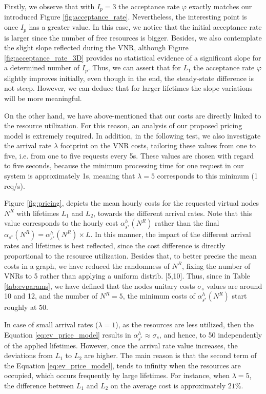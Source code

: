Firstly, we observe that with $I_p = 3$ the acceptance rate $\varphi$ exactly matches our introduced Figure \ref{fig:acceptance_rate}. Nevertheless, the interesting point is once $I_p$ has a greater value. In this case, we notice that the initial acceptance rate is larger since the number of free resources is bigger. Besides, we also contemplate the slight slope reflected during the VNR, although Figure \ref{fig:acceptance_rate_3D} provides no statistical evidence of a significant slope for a determined number of $I_p$. Thus, we can assert that for $L_1$ the acceptance rate $\varphi$ slightly improves initially, even though in the end, the steady-state difference is not steep. However, we can deduce that for larger lifetimes the slope variations will be more meaningful.

On the other hand, we have above-mentioned that our costs are directly linked to the resource utilization. For this reason, an analysis of our proposed pricing model is extremely required. In addition, in the following test, we also investigate the arrival rate $\lambda$ footprint on the VNR costs, tailoring these values from one to five, i.e. from one to five requests every 5s. These values are chosen with regard to five seconds, because the minimum processing time for one request in our system is approximately 1s, meaning that $\lambda = 5$ corresponds to this minimum (1 req/s).

Figure \ref{fig:pricing}, depicts the mean hourly costs for the requested virtual nodes $N^R$ with lifetimes $L_1$ and $L_2$, towards the different arrival rates. Note that this value corresponds to the hourly cost $\alpha^{h}_{s^{*}}(N^R)$ rather than the final $ \alpha_{s^{*}}(N^R) = \alpha^{h}_{s^{*}}(N^R) \times L$. In this manner, the impact of the different arrival rates and lifetimes is best reflected, since the cost difference is directly proportional to the resource utilization. Besides that, to better precise the mean costs in a graph, we have reduced the randomness of $N^R$, fixing the number of VNRs to 5 rather than applying a uniform distrib. [5,10]. Thus, since in Table \ref{tab:evparams}, we have defined that the nodes unitary costs $\sigma_s$ values are around 10 and 12, and the number of $N^R = 5$, the minimum costs of $\alpha^{h}_{s^{*}}(N^R)$ start roughly at 50.

In case of small arrival rates ($\lambda = 1$), as the resources are less utilized, then the Equation \ref{eq:ev_price_model} results in $\alpha^{h}_{s^{*}} \approx \sigma_s$, and hence, to 50 independently of the applied lifetimes. However, once the arrival rate value increases, the deviations from $L_1$ to $L_2$ are higher. The main reason is that the second term of the Equation \ref{eq:ev_price_model}, tends to infinity when the resources are occupied, which occurs frequently by large lifetimes. For instance, when $\lambda = 5$, the difference between $L_1$ and $L_2$ on the average cost is approximately $21\%$.

